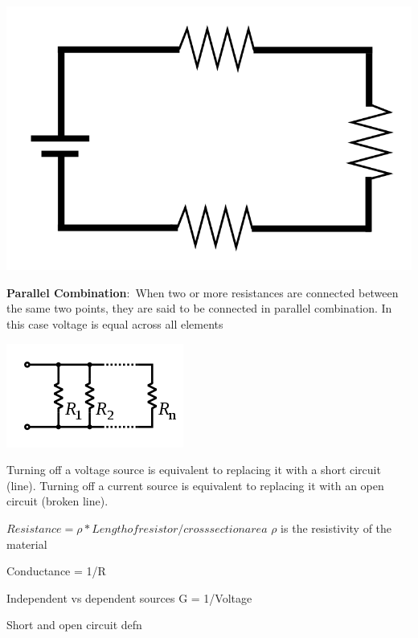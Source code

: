 \documentclass[nobib]{tufte-handout}
\newcommand{\defn}[2]{\noindent\textbf{#1}:\ #2}
\begin{document}
\includegraphics[width=\textwidth/2]{images/Series_circuit.svg.png}

\defn{Parallel Combination}{When two or more resistances are 
connected between the same two points, they are said to be 
connected in parallel combination. In this case voltage is equal
across all elements}

\includegraphics[width=\textwidth/2]{images/220px-Resistors_in_parallel.svg.png}

Turning off a voltage source is equivalent to replacing it with a 
short circuit (line). Turning off a current source is equivalent to replacing it with an
open circuit (broken line). 

$Resistance = \rho * Length of resistor/ cross section area$ $\rho$ is the resistivity of the material 

Conductance = 1/R 

Independent vs dependent sources 
G = 1/Voltage

Short and open circuit defn
\end{document}
